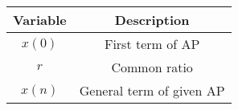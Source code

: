 \begin{tabular}{|c|c|}
      \hline
      Variable & Description \\\hline
      $x(0)$ & First term of AP \\\hline
      $r$ & Common ratio \\\hline
      $x(n)$ & General term of given AP\\\hline
\end{tabular}
